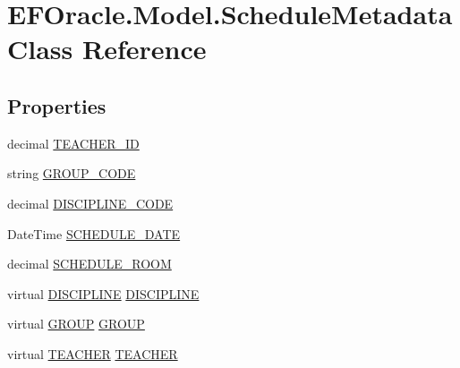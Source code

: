 \hypertarget{class_e_f_oracle_1_1_model_1_1_schedule_metadata}{}\section{E\+F\+Oracle.\+Model.\+Schedule\+Metadata Class Reference}
\label{class_e_f_oracle_1_1_model_1_1_schedule_metadata}
\subsection*{Properties}
\begin{DoxyCompactItemize}
\item 
decimal \hyperlink{class_e_f_oracle_1_1_model_1_1_schedule_metadata_a34f92b2df8eef5012a62b2fc88384f8e}{T\+E\+A\+C\+H\+E\+R\+\_\+\+ID}
\item 
string \hyperlink{class_e_f_oracle_1_1_model_1_1_schedule_metadata_aaafcba28fc98d8b0e1f7c1d01fa162f7}{G\+R\+O\+U\+P\+\_\+\+C\+O\+DE}
\item 
decimal \hyperlink{class_e_f_oracle_1_1_model_1_1_schedule_metadata_a3f7670dba054bc7de4fb175882dfdaa7}{D\+I\+S\+C\+I\+P\+L\+I\+N\+E\+\_\+\+C\+O\+DE}
\item 
Date\+Time \hyperlink{class_e_f_oracle_1_1_model_1_1_schedule_metadata_a395ee9fa9ce0ee5e2266c3595d232013}{S\+C\+H\+E\+D\+U\+L\+E\+\_\+\+D\+A\+TE}
\item 
decimal \hyperlink{class_e_f_oracle_1_1_model_1_1_schedule_metadata_a2328ac1c9c8acf363774625016cc2f78}{S\+C\+H\+E\+D\+U\+L\+E\+\_\+\+R\+O\+OM}
\item 
virtual \hyperlink{class_e_f_oracle_1_1_model_1_1_d_i_s_c_i_p_l_i_n_e}{D\+I\+S\+C\+I\+P\+L\+I\+NE} \hyperlink{class_e_f_oracle_1_1_model_1_1_schedule_metadata_a1b0e8d574ca3bba4f029cdee8c4d12cb}{D\+I\+S\+C\+I\+P\+L\+I\+NE}
\item 
virtual \hyperlink{class_e_f_oracle_1_1_model_1_1_g_r_o_u_p}{G\+R\+O\+UP} \hyperlink{class_e_f_oracle_1_1_model_1_1_schedule_metadata_ad1249eb1718f7573d421991f6c747219}{G\+R\+O\+UP}
\item 
virtual \hyperlink{class_e_f_oracle_1_1_model_1_1_t_e_a_c_h_e_r}{T\+E\+A\+C\+H\+ER} \hyperlink{class_e_f_oracle_1_1_model_1_1_schedule_metadata_af6379f2c8f84516657cd2f7155b954b4}{T\+E\+A\+C\+H\+ER}
\end{DoxyCompactItemize}


